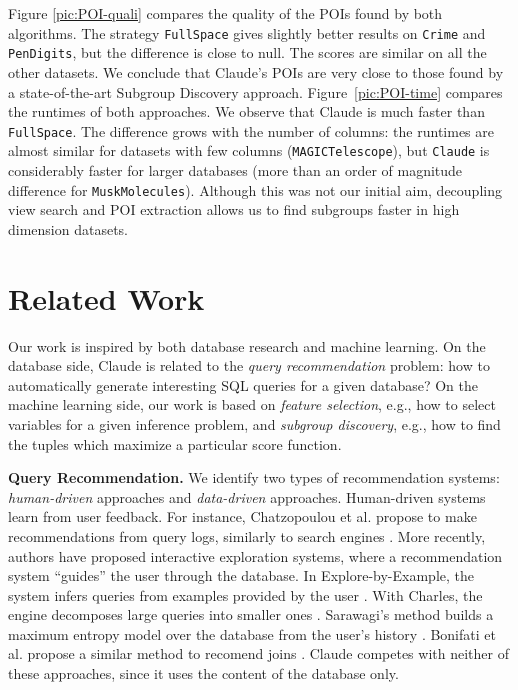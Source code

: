 Figure \ref{pic:POI-quali} compares the quality of the POIs found by both
algorithms. The strategy \texttt{FullSpace} gives slightly better results on
\texttt{Crime} and \texttt{PenDigits}, but the difference is close to null. The
scores are similar on all the other datasets. We conclude that Claude's POIs
are very close to those found by a state-of-the-art Subgroup Discovery approach.
Figure~\ref{pic:POI-time} compares the runtimes of both approaches.  We observe
that Claude is much faster than \texttt{FullSpace}. The difference grows with
the number of columns: the runtimes are almost similar for datasets with few
columns (\texttt{MAGICTelescope}), but \texttt{Claude} is considerably faster
for larger databases (more than an order of magnitude difference for
\texttt{MuskMolecules}). Although this was not our initial aim, decoupling view
search and POI extraction allows us to find subgroups faster in high dimension
datasets.

\section{Related Work}
Our work is inspired by both database research and machine learning. On the
database side, Claude is related to the \emph{query recommendation} problem:
how to automatically generate interesting SQL queries for a given database? On
the machine learning side, our work is based on \emph{feature selection}, e.g.,
how to select variables for a given inference problem, and \emph{subgroup
discovery}, e.g., how to find the tuples which maximize a particular score
function.

\textbf{Query Recommendation.} We identify two types of recommendation systems:
\emph{human-driven} approaches and \emph{data-driven} approaches. Human-driven
systems learn from user feedback. For instance, Chatzopoulou et al. propose to
make recommendations from query logs, similarly to search engines
\cite{chatzopoulou2009query}. More recently, authors have proposed interactive
exploration systems, where a recommendation system ``guides'' the user through
the database. In Explore-by-Example, the system infers queries from examples
provided by the user \cite{dimitriadou2014explore}. With Charles, the engine
decomposes large queries into smaller ones \cite{sellam2013meet}. Sarawagi's
method builds a maximum entropy model over the database from the user's history 
\cite{sarawagi2000user}. Bonifati et al. propose a similar method to recomend
joins \cite{bonifati2014interactive}.  Claude competes with neither of these
approaches, since it uses the content of the database only.

